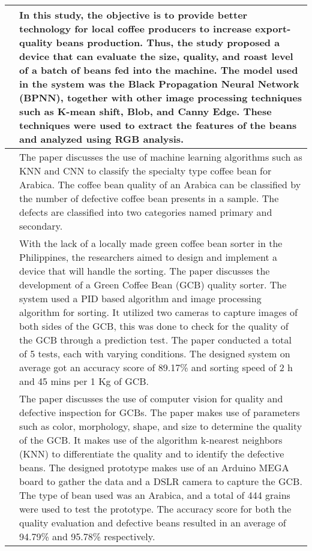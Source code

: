 \begin{center}
\begin{longtable}{| p{4cm} | p{10cm} |}
		\cite{Balbin_Del_Valle_Lopez_Quiambao_2020}
		&
		In this study, the objective is to provide better technology for local coffee producers to increase export-quality beans production. Thus, the study proposed a device that can evaluate the size, quality, and roast level of a batch of beans fed into the machine. The model used in the system was the Black Propagation Neural Network (BPNN), together with other image processing techniques such as K-mean shift, Blob, and Canny Edge. These techniques were used to extract the features of the beans and analyzed using RGB analysis. \\
		\hline

		\cite{Pragathi_Jacob_2024}
		&
		The paper discusses the use of machine learning algorithms such as KNN and CNN to classify the specialty type coffee bean for Arabica. The coffee bean quality of an Arabica can be classified by the number of defective coffee bean presents in a sample. The defects are classified into two categories named primary and secondary. \\
		\hline

		\cite{Lualhati_Mariano_Torres_Fenol_2022}
		&
		With the lack of a locally made green coffee bean sorter in the Philippines, the researchers aimed to design and implement a device that will handle the sorting. The paper discusses the development of a Green Coffee Bean (GCB)  quality sorter. The system used a PID based algorithm and image processing algorithm for sorting. It utilized two cameras to capture images of both sides of the GCB, this was done to check for the quality of the GCB through a prediction test. The paper conducted a total of 5 tests, each with varying conditions. The designed system on average got an accuracy score of 89.17\% and sorting speed of 2 h and 45 mins per 1 Kg of GCB.  \\
		\hline

		\cite{García_Candelo_Becerra_Hoyos_2019}
		&
		The paper discusses the use of computer vision for quality and defective inspection for GCBs. The paper makes use of parameters such as color, morphology, shape, and size to determine the quality of the GCB. It makes use of the algorithm k-nearest neighbors (KNN) to differentiate the quality and to identify the defective beans. The designed prototype makes use of an Arduino MEGA board to gather the data and a DSLR camera to capture the GCB. The type of bean used was an Arabica, and a total of 444 grains were used to test the prototype. The accuracy score for both the quality evaluation and defective beans resulted in an average of 94.79\% and 95.78\% respectively. \\
		\hline


\end{longtable}
\end{center}
